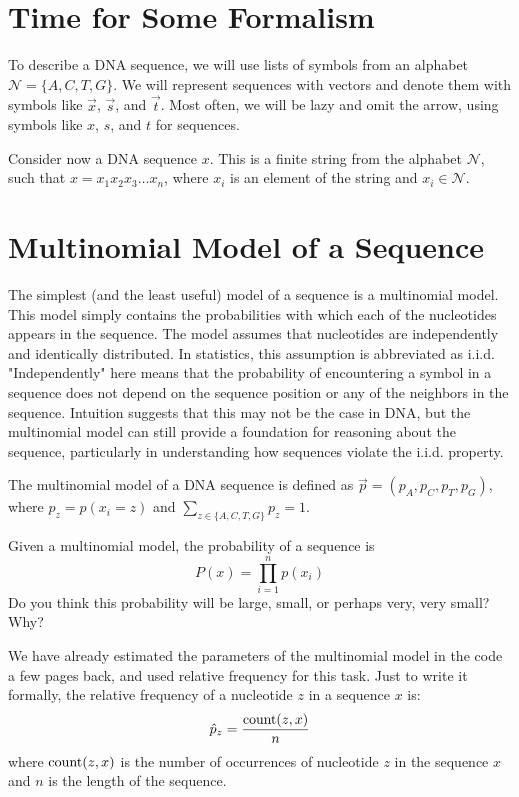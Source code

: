 \section*{Time for Some Formalism}
To describe a DNA sequence, we will use lists of symbols from an alphabet $\mathcal{N} = \{A, C, T, G\}$. We will represent sequences with vectors and denote them with symbols like $\vec{x}$, $\vec{s}$, and $\vec{t}$. Most often, we will be lazy and omit the arrow, using symbols like $x$, $s$, and $t$ for sequences.

Consider now a DNA sequence $x$. This is a finite string from the alphabet $\mathcal{N}$, such that $x = x_1x_2x_3 \dots x_n$, where $x_i$ is an element of the string and $x_i \in \mathcal{N}$.

\section*{Multinomial Model of a Sequence}

The simplest (and the least useful) model of a sequence is a multinomial model. This model simply contains the probabilities with which each of the nucleotides appears in the sequence. The model assumes that nucleotides are independently and identically distributed. In statistics, this assumption is abbreviated as i.i.d. "Independently" here means that the probability of encountering a symbol in a sequence does not depend on the sequence position or any of the neighbors in the sequence. Intuition suggests that this may not be the case in DNA, but the multinomial model can still provide a foundation for reasoning about the sequence, particularly in understanding how sequences violate the i.i.d. property.

The multinomial model of a DNA sequence is defined as $\vec{p} = (p_A, p_C, p_T, p_G)$, where $p_z = p(x_i = z)$ and $\sum_{z \in \{A, C, T, G\}} p_z = 1$.

Given a multinomial model, the probability of a sequence is
\[
P(x) = \prod_{i=1}^{n} p(x_i)
\]
Do you think this probability will be large, small, or perhaps very, very small? Why?

We have already estimated the parameters of the multinomial model in the code a few pages back, and used relative frequency for this task. Just to write it formally, the relative frequency of a nucleotide $z$ in a sequence $x$ is:
\[
\hat{p}_z = \frac{{\rm count}(z, x)}{n}
\]
where ${\rm count}(z, x)$ is the number of occurrences of nucleotide $z$ in the sequence $x$ and $n$ is the length of the sequence.

